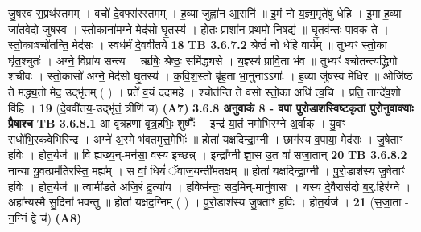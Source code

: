\documentclass[17pt]{extarticle}
\begin{document}
{{{{{{{{{{{{{{{{{{{                  जु॒षस्व॑ स॒प्रथ॑स्तमम् । वचो॑ दे॒वफ्स॑रस्तमम् । ह॒व्या जुह्वा॑न आ॒सनि॑ ॥ इ॒मं नो॑ य॒ज्ञ्म॒मृते॑षु धेहि । इ॒मा ह॒व्या जा॑तवेदो जुषस्व । स्तो॒काना॑मग्ने॒ मेद॑सो घृ॒तस्य॑ । होतः॒ प्राशा॑न प्रथ॒मो नि॒षद्य॑ ॥ घृ॒तव॑न्तः पावक ते । स्तो॒काःश्चो॑तन्ति॒ मेद॑सः । स्वध॑र्मं दे॒ववी॑तये \textbf{ 18} \newline
                  \newline
                                \textbf{ TB 3.6.7.2} \newline
                  श्रेष्ठं॑ नो धेहि॒ वार्य᳚म् ॥ तुभ्यꣳ॑ स्तो॒का घृ॑त॒श्चुतः॑ । अग्ने॒ विप्रा॑य सन्त्य । ऋषिः॒ श्रेष्ठः॒ समि॑द्ध्यसे । य॒ज्ञ्स्य॑ प्रावि॒ता भ॑व ॥ तुभ्यꣳ॑ श्चोतन्त्यद्ध्रिगो शचीवः । स्तो॒कासो॑ अग्ने॒ मेद॑सो घृ॒तस्य॑ । क॒वि॒श॒स्तो बृ॑ह॒ता भा॒नुनाऽऽगाः᳚ । ह॒व्या जु॑षस्व मेधिर ॥ ओजि॑ष्ठं ते मद्ध्य॒तो मेद॒ उद्भृ॑तम् ( ) । प्रते॑ व॒यं द॑दामहे । श्चोत॑न्ति ते वसो स्तो॒का अधि॑ त्व॒चि । प्रति॒ तान्दे॑व॒शो वि॑हि । \textbf{ 19} \newline
                  \newline
                                    (दे॒ववी॑तय॒-उद्भृ॑तं॒ त्रीणि॑ च) \textbf{(A7)} \newline \newline
                \textbf{ 3.6.8     अनुवाकं   8 - वपा पुरोडाशस्विष्टकृतां पुरोनुवाक्याः प्रैषाश्च} \newline
                                \textbf{ TB 3.6.8.1} \newline
                  आ वृ॑त्रहणा वृत्र॒हभिः॒ शुष्मैः᳚ । इन्द्र॑ या॒तं नमो॑भिरग्ने अ॒र्वाक् । यु॒वꣳ राधो॑भि॒रक॑वेभिरिन्द्र । अग्ने॑ अ॒स्मे भ॑वतमुत्त॒मेभिः॑ ॥ होता॑ यक्षदिन्द्रा॒ग्नी । छाग॑स्य व॒पाया॒ मेद॑सः । जु॒षेताꣳ॑ ह॒विः । होत॒र्यज॑ ॥ वि ह्यख्य॒न्-मन॑सा॒ वस्य॑ इ॒च्छन्न् । इन्द्रा᳚ग्नी ज्ञा॒स उ॒त वा॑ सजा॒तान् \textbf{ 20} \newline
                  \newline
                                \textbf{ TB 3.6.8.2} \newline
                  नान्या यु॒वत्प्रम॑तिरस्ति॒ मह्य᳚म् । स वां॒ धियं॑ ॅवाज॒यन्ती॑मतक्षम् ॥ होता॑ यक्षदिन्द्रा॒ग्नी । पु॒रो॒डाश॑स्य जु॒षेताꣳ॑ ह॒विः । होत॒र्यज॑ ॥ त्वामी॑डते अजि॒रं दू॒त्या॑य । ह॒विष्म॑न्तः॒ सद॒मिन्-मानु॑षासः । यस्य॑ दे॒वैरास॑दो ब॒र्॒.हिर॑ग्ने । अहा᳚न्यस्मै सु॒दिना॑ भवन्तु ॥ होता॑ यक्षद॒ग्निम् ( ) । पु॒रो॒डाश॑स्य जु॒षताꣳ॑ ह॒विः । होत॒र्यज॑ । \textbf{ 21} \newline
                  \newline
                                    (स॒जा॒ता - न॒ग्निं द्वे च॑) \textbf{(A8)} \newline \newline
}}}}}}}}}}}}}}}}}}}
\end{document}
